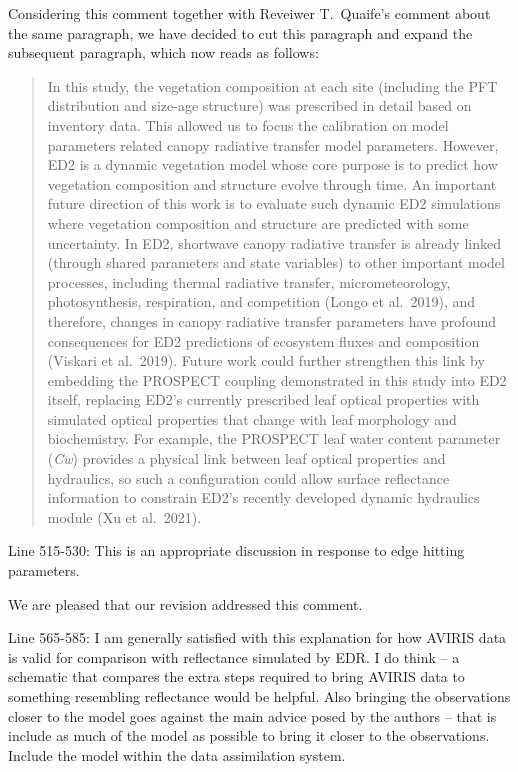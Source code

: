 \documentclass{article}
\newenvironment{reviewer}{\par\color{Mahogany}\vspace{6pt}}{\par\vspace{6pt}}
\begin{document}
Considering this comment together with Reveiwer T.\ Quaife's comment about the same paragraph, we have decided to cut this paragraph and expand the subsequent paragraph, which now reads as follows:

\begin{quote}
  In this study, the vegetation composition at each site (including the PFT distribution and size-age structure) was prescribed in detail based on inventory data.
  This allowed us to focus the calibration on model parameters related canopy radiative transfer model parameters.
  However, ED2 is a dynamic vegetation model whose core purpose is to predict how vegetation composition and structure evolve through time.
  An important future direction of this work is to evaluate such dynamic ED2 simulations where vegetation composition and structure are predicted with some uncertainty.
  In ED2, shortwave canopy radiative transfer is already linked (through shared parameters and state variables) to other important model processes, including thermal radiative transfer, micrometeorology, photosynthesis, respiration, and competition (Longo et al.\ 2019),
  and therefore, changes in canopy radiative transfer parameters have profound consequences for ED2 predictions of ecosystem fluxes and composition (Viskari et al.\ 2019).
  Future work could further strengthen this link by embedding the PROSPECT coupling demonstrated in this study into ED2 itself, replacing ED2's currently prescribed leaf optical properties with simulated optical properties that change with leaf morphology and biochemistry.
  For example, the PROSPECT leaf water content parameter (\emph{Cw}) provides a physical link between leaf optical properties and hydraulics, so such a configuration could allow surface reflectance information to constrain ED2's recently developed dynamic hydraulics module (Xu et al.\ 2021).
\end{quote}

\begin{reviewer}
  Line 515-530: This is an appropriate discussion in response to edge hitting parameters.
\end{reviewer}

We are pleased that our revision addressed this comment.

\begin{reviewer}
  Line 565-585: I am generally satisfied with this explanation for how AVIRIS data is valid for comparison with reflectance simulated by EDR. I do think – a schematic that compares the extra steps required to bring AVIRIS data to something resembling reflectance would be helpful. Also bringing the observations closer to the model goes against the main advice posed by the authors -- that is include as much of the model as possible to bring it closer to the observations. Include the model within the data assimilation system.
\end{reviewer}
\end{document}
